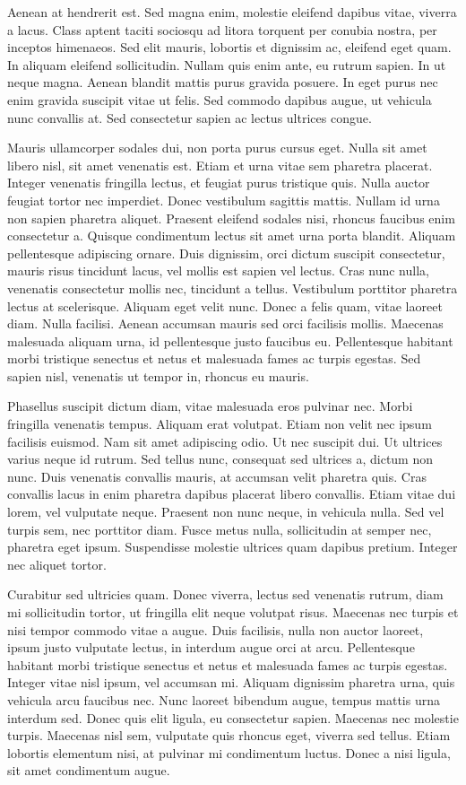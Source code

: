 Aenean at hendrerit est. Sed magna enim, molestie eleifend dapibus vitae, viverra a lacus. Class aptent taciti sociosqu ad litora torquent per conubia nostra, per inceptos himenaeos. Sed elit mauris, lobortis et dignissim ac, eleifend eget quam. In aliquam eleifend sollicitudin. Nullam quis enim ante, eu rutrum sapien. In ut neque magna. Aenean blandit mattis purus gravida posuere. In eget purus nec enim gravida suscipit vitae ut felis. Sed commodo dapibus augue, ut vehicula nunc convallis at. Sed consectetur sapien ac lectus ultrices congue.

Mauris ullamcorper sodales dui, non porta purus cursus eget. Nulla sit amet libero nisl, sit amet venenatis est. Etiam et urna vitae sem pharetra placerat. Integer venenatis fringilla lectus, et feugiat purus tristique quis. Nulla auctor feugiat tortor nec imperdiet. Donec vestibulum sagittis mattis. Nullam id urna non sapien pharetra aliquet. Praesent eleifend sodales nisi, rhoncus faucibus enim consectetur a. Quisque condimentum lectus sit amet urna porta blandit. Aliquam pellentesque adipiscing ornare. Duis dignissim, orci dictum suscipit consectetur, mauris risus tincidunt lacus, vel mollis est sapien vel lectus. Cras nunc nulla, venenatis consectetur mollis nec, tincidunt a tellus. Vestibulum porttitor pharetra lectus at scelerisque. Aliquam eget velit nunc. Donec a felis quam, vitae laoreet diam. Nulla facilisi. Aenean accumsan mauris sed orci facilisis mollis. Maecenas malesuada aliquam urna, id pellentesque justo faucibus eu. Pellentesque habitant morbi tristique senectus et netus et malesuada fames ac turpis egestas. Sed sapien nisl, venenatis ut tempor in, rhoncus eu mauris.

Phasellus suscipit dictum diam, vitae malesuada eros pulvinar nec. Morbi fringilla venenatis tempus. Aliquam erat volutpat. Etiam non velit nec ipsum facilisis euismod. Nam sit amet adipiscing odio. Ut nec suscipit dui. Ut ultrices varius neque id rutrum. Sed tellus nunc, consequat sed ultrices a, dictum non nunc. Duis venenatis convallis mauris, at accumsan velit pharetra quis. Cras convallis lacus in enim pharetra dapibus placerat libero convallis. Etiam vitae dui lorem, vel vulputate neque. Praesent non nunc neque, in vehicula nulla. Sed vel turpis sem, nec porttitor diam. Fusce metus nulla, sollicitudin at semper nec, pharetra eget ipsum. Suspendisse molestie ultrices quam dapibus pretium. Integer nec aliquet tortor.

Curabitur sed ultricies quam. Donec viverra, lectus sed venenatis rutrum, diam mi sollicitudin tortor, ut fringilla elit neque volutpat risus. Maecenas nec turpis et nisi tempor commodo vitae a augue. Duis facilisis, nulla non auctor laoreet, ipsum justo vulputate lectus, in interdum augue orci at arcu. Pellentesque habitant morbi tristique senectus et netus et malesuada fames ac turpis egestas. Integer vitae nisl ipsum, vel accumsan mi. Aliquam dignissim pharetra urna, quis vehicula arcu faucibus nec. Nunc laoreet bibendum augue, tempus mattis urna interdum sed. Donec quis elit ligula, eu consectetur sapien. Maecenas nec molestie turpis. Maecenas nisl sem, vulputate quis rhoncus eget, viverra sed tellus. Etiam lobortis elementum nisi, at pulvinar mi condimentum luctus. Donec a nisi ligula, sit amet condimentum augue.

